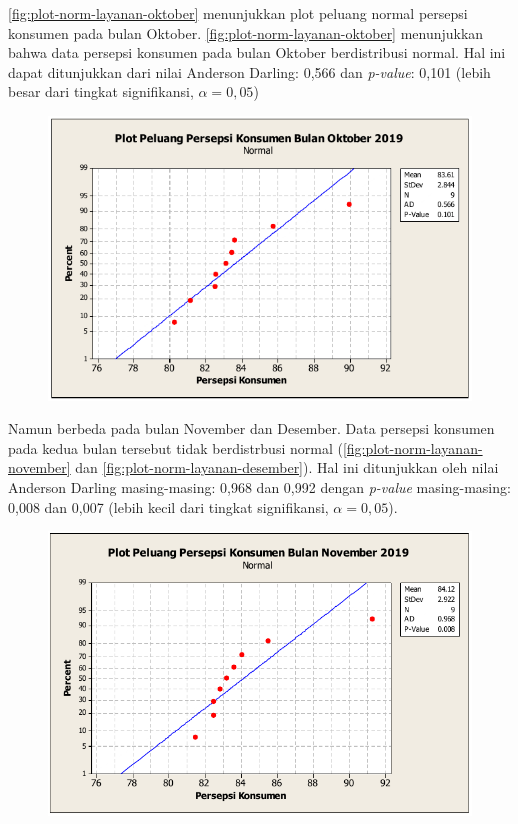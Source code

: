 \autoref{fig:plot-norm-layanan-oktober} menunjukkan plot peluang normal persepsi konsumen pada bulan Oktober. \autoref{fig:plot-norm-layanan-oktober} menunjukkan bahwa data persepsi konsumen pada bulan Oktober berdistribusi normal. Hal ini dapat ditunjukkan dari nilai Anderson Darling: 0,566 dan \textit{p-value}: 0,101 (lebih besar dari tingkat signifikansi, $\alpha = 0{,}05$)

\begin{figure}[H]
    \centering
    \includegraphics[width=.7\linewidth]{pdf/Plot-peluang-normal-pada-persepsi-konsumen-terhadap-layanan-di-MMP-Grha-Tiyasa-pada-bulan-Oktober-2019.pdf}
    \label{fig:plot-norm-layanan-oktober}
\end{figure}

Namun berbeda pada bulan November dan Desember. Data persepsi konsumen pada kedua bulan tersebut tidak berdistrbusi normal (\autoref{fig:plot-norm-layanan-november} dan \autoref{fig:plot-norm-layanan-desember}). Hal ini ditunjukkan oleh nilai Anderson Darling masing-masing: 0,968 dan 0,992 dengan \textit{p-value} masing-masing: 0,008 dan 0,007 (lebih kecil dari tingkat signifikansi, $\alpha = 0{,}05$). 

\begin{figure}[H]
    \centering
    \includegraphics[width=.7\linewidth]{pdf/Plot-peluang-normal-pada-persepsi-konsumen-terhadap-layanan-di-MMP-Grha-Tiyasa-pada-bulan-November-2019.pdf}
    \label{fig:plot-norm-layanan-november}
\end{figure}


